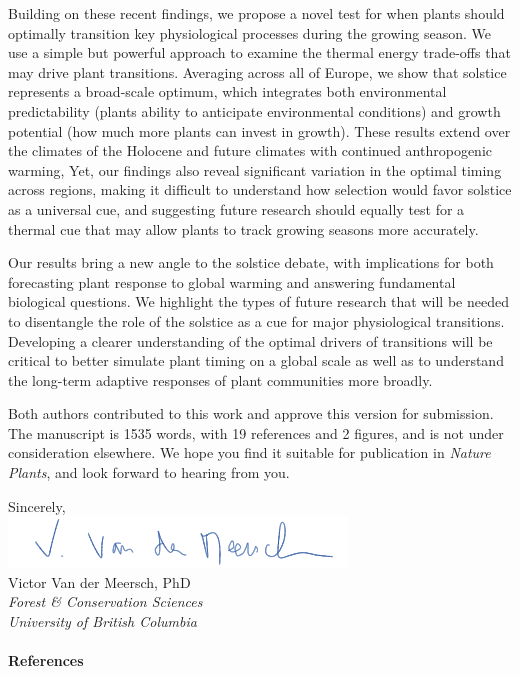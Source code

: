 \documentclass[11pt,a4paper]{article}
\begin{document}
\noindent Building on these recent findings, we propose a novel test for when plants should optimally transition key physiological processes during the growing season. We use a simple but powerful approach to  examine the thermal energy trade-offs that may drive plant transitions. %
Averaging across all of Europe, we show that solstice represents a broad-scale optimum, which integrates both environmental predictability (plants ability to anticipate environmental conditions) and growth potential (how much more plants can invest in growth). These results extend over the climates of the Holocene and future climates with continued anthropogenic warming, Yet, our findings also reveal significant variation in the optimal timing across regions, making it difficult to understand how selection would favor solstice as a universal cue, and suggesting future research should equally test for a thermal cue that may allow plants to track growing seasons more accurately.

\vspace{0.25cm}

\noindent Our results bring a new angle to the solstice debate, with implications for both forecasting plant response to global warming and answering fundamental biological questions. We highlight the types of future research that will be needed to disentangle the role of the solstice as a cue for major physiological transitions. Developing a clearer understanding of the optimal drivers of transitions will be critical to better simulate plant timing on a global scale as well as to understand the long-term adaptive responses of plant communities more broadly. 

\vspace{0.25cm}

\noindent Both authors contributed to this work and approve this version for submission. The manuscript is 1535 words, with 19 references and 2 figures, and is not under consideration elsewhere. We hope you find it suitable for publication in \emph{Nature Plants}, and look forward to hearing from you. 

\vspace{0.45cm}
\noindent Sincerely, 
\vspace{0.45cm}\\
\hspace*{-0.5cm}
\includegraphics[scale=.65]{sign_long.png} \\
\noindent Victor Van der Meersch, PhD\\
\noindent \emph{Forest \& Conservation Sciences}\\
\noindent \emph{University of British Columbia}

\clearpage

\paragraph{References}
\printbibliography[heading=none]


\newpage
\end{document}
